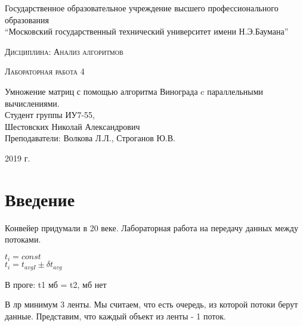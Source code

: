 \documentclass[a4paper, 14pt]{article}
\begin{document}
    \begin{titlepage}

        \begin{center}
            \large
            Государственное образовательное учреждение высшего профессионального образования\\
            “Московский государственный технический университет имени Н.Э.Баумана”
            \vspace{3cm}
            
            \textsc{Дисциплина: Анализ алгоритмов}
            \vspace{0.5cm}
                
            \textsc{Лабораторная работа 4}
            \vspace{1.5cm}
            
            {\LARGE Умножение матриц с помощью алгоритма Винограда c параллельными вычислениями.\\}
            \vspace{1.5cm}
            Студент группы ИУ7-55,\\   
            Шестовских Николай Александрович\\
            Преподаватели: Волкова Л.Л., Строганов Ю.В.
            \vfill
            
            2019 г.
            
            \end{center}

    \end{titlepage}
    \setcounter{page}{2}
\tableofcontents
	
	\newpage
	
        \section*{Введение}
        
        
 		Конвейер придумали в 20 веке. Лабораторная работа на передачу данных между потоками. 
 		
 		$t_{i} = const$\\
 		$t_{i} = t_{avgI} \pm \delta t_{avg}$
 		
 		
 		В проге:
 		t1 мб = t2, мб нет
 		
 		В лр минимум 3 ленты. Мы считаем, что есть очередь, из которой потоки берут данные. Представим, что каждый объект из ленты - 1 поток.
 		
\end{document}
